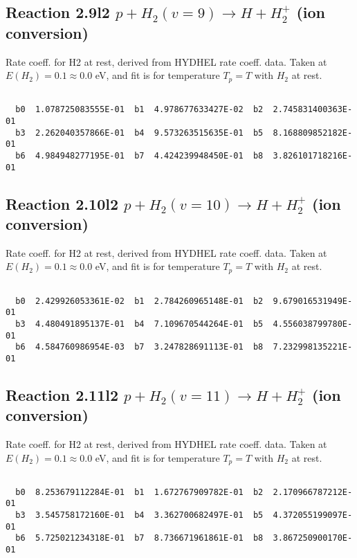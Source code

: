 \newpage
\subsection{
Reaction 2.9l2
$ p + H_2(v=9) \rightarrow H + H_2^+$ (ion conversion)
}
Rate coeff. for H2 at rest, derived from HYDHEL rate coeff. data.
Taken at $E(H_2) = 0.1 \approx 0.0$ eV,  and fit is for temperature $T_p=T$ with $H_2$ at rest.

\begin{small}\begin{verbatim}

  b0  1.078725083555E-01  b1  4.978677633427E-02  b2  2.745831400363E-01
  b3  2.262040357866E-01  b4  9.573263515635E-01  b5  8.168809852182E-01
  b6  4.984948277195E-01  b7  4.424239948450E-01  b8  3.826101718216E-01

\end{verbatim}\end{small}

\newpage
\subsection{
Reaction 2.10l2
$ p + H_2(v=10) \rightarrow H + H_2^+$ (ion conversion)
}
Rate coeff. for H2 at rest, derived from HYDHEL rate coeff. data.
Taken at $E(H_2) = 0.1 \approx 0.0$ eV,  and fit is for temperature $T_p=T$ with $H_2$ at rest.

\begin{small}\begin{verbatim}

  b0  2.429926053361E-02  b1  2.784260965148E-01  b2  9.679016531949E-01
  b3  4.480491895137E-01  b4  7.109670544264E-01  b5  4.556038799780E-01
  b6  4.584760986954E-03  b7  3.247828691113E-01  b8  7.232998135221E-01

\end{verbatim}\end{small}

\newpage
\subsection{
Reaction 2.11l2
$ p + H_2(v=11) \rightarrow H + H_2^+$ (ion conversion)
}
Rate coeff. for H2 at rest, derived from HYDHEL rate coeff. data.
Taken at $E(H_2) = 0.1 \approx 0.0$ eV,  and fit is for temperature $T_p=T$ with $H_2$ at rest.

\begin{small}\begin{verbatim}

  b0  8.253679112284E-01  b1  1.672767909782E-01  b2  2.170966787212E-01
  b3  3.545758172160E-01  b4  3.362700682497E-01  b5  4.372055199097E-01
  b6  5.725021234318E-01  b7  8.736671961861E-01  b8  3.867250900170E-01

\end{verbatim}\end{small}

